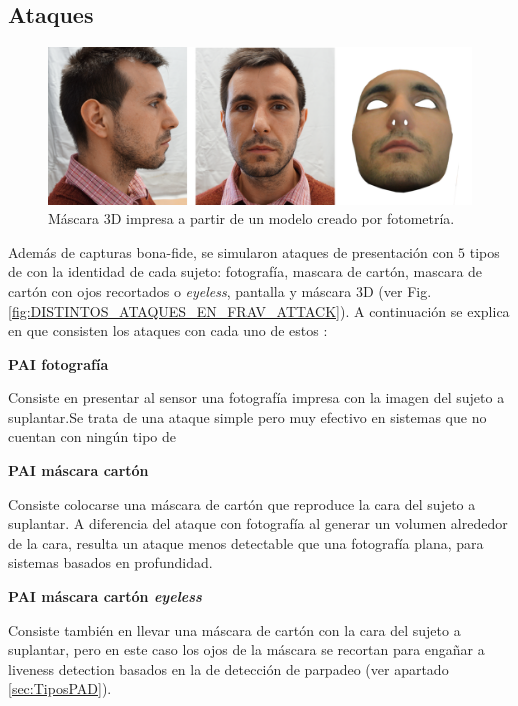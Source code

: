 \subsection{Ataques}\label{subsec:PAI-FRAV-Attack}


\begin{figure}[t]
    \centering
    \includegraphics[width=1\linewidth]{ch-sistemasABC/images/ch-BBDDs/CONSTRUCCION_MASCARAS_3D.png}
    \caption{Máscara $3$D impresa a partir de un modelo creado por fotometría.}
    \label{fig:ConstrucionMascara3D}
\end{figure}

Además de capturas \gls{bona-fide}, se simularon ataques de presentación con $5$ tipos de  con la identidad de cada sujeto: fotografía, mascara de cartón, mascara de cartón con ojos recortados o \textit{eyeless}, pantalla y máscara $3$D (ver Fig. \ref{fig:DISTINTOS_ATAQUES_EN_FRAV_ATTACK}). A continuación se explica en que consisten los ataques con cada uno de estos :

\medskip
\textbf{PAI fotografía} 

Consiste en presentar al sensor una fotografía impresa con la imagen del sujeto a suplantar.Se trata de una ataque simple pero muy efectivo en sistemas que no cuentan con ningún tipo de 

\medskip
\textbf{PAI máscara cartón} 

Consiste colocarse una máscara de cartón que reproduce la cara del sujeto a suplantar. A diferencia del ataque con fotografía al generar un volumen alrededor de la cara, resulta un ataque menos detectable que una fotografía plana, para sistemas  basados en profundidad.
    
\medskip
\textbf{PAI máscara cartón \textit{eyeless}}

Consiste también en llevar una máscara de cartón con la cara del sujeto a suplantar, pero en este caso los ojos de la máscara se recortan para engañar a \gls{liveness detection}  basados en la de detección de parpadeo (ver apartado \ref{sec:TiposPAD}).

